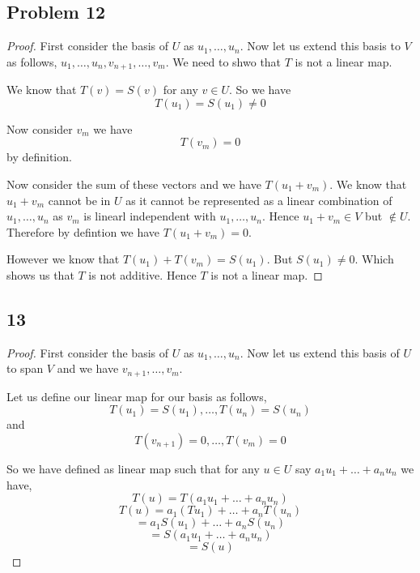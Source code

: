 \documentclass[a4paper]{report}
\begin{document}
\subsection*{Problem 12}
\begin{proof}
    First consider the basis of $U$ as $u_1,\dots,u_n$. Now let us extend this basis to $V$ as follows, $u_1,\dots, u_n, v_{n+1}, \dots, v_m$. We need to shwo that $T$ is not a linear map.

    We know that $T(v) = S(v) $ for any  $v \in U$. So we have  
    $$ T(u_1) = S(u_1) \ne 0 $$ 

    Now consider  $v_m$ we have  
    $$ T(v_m) = 0 $$  by definition.

    Now consider the sum of these vectors and we have $T(u_1+ v_m)$. We know that $u_1 + v_m$ cannot be in $U$ as it cannot be represented as a linear combination of $u_1,\dots,u_n$ as $v_m$ is linearl independent with $u_1,\dots,u_n$. Hence $u_1 + v_m \in V$  but $\not \in U$. Therefore by defintion we have  $T(u_1 + v_m) = 0$.

    However we know that $T(u_1) + T(v_m) = S(u_1)$. But $S(u_1) \ne 0$. Which shows us that $T$ is not additive. Hence $T$ is not a linear map.
\end{proof}


\subsection*{13}
\begin{proof}
    First consider the basis of $U$ as $u_1,\dots, u_n$. Now let us extend this basis of $U$ to span $V$ and we have $v_{n+1}, \dots, v_m$.

    Let us define our linear map for our basis as follows, 
    $$ T(u_1) = S(u_1),\dots,T(u_n) = S(u_n) $$  and 
    $$ T(v_{n+1}) = 0,\dots,T(v_{m}) = 0 $$ 

    So we have defined as linear map such that for any $u \in U$ say $a_1u_1 + \dots + a_nu_n$ we have, 
    $$ T(u) = T(a_1u_1 + \dots + a_nu_n) $$  
    $$ T(u) = a_1(Tu_1) + \dots + a_nT(u_n) $$ 
    $$ = a_1S(u_1) + \dots + a_nS(u_n) $$ 
    $$ = S(a_1u_1 + \dots + a_nu_n) $$ 
    $$ = S(u) $$ 
\end{proof}
\end{document}
